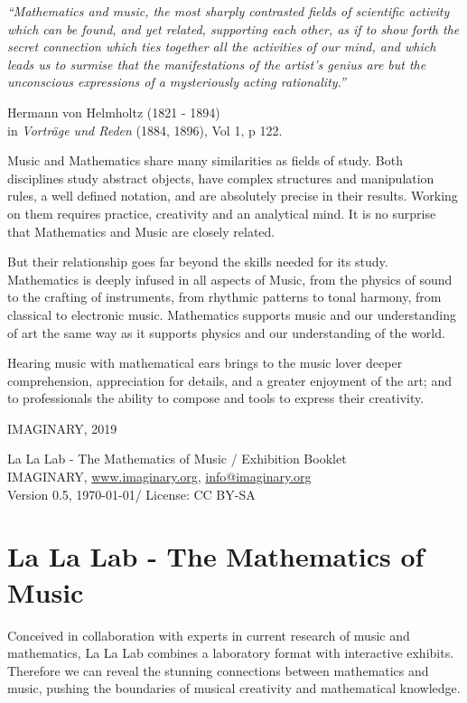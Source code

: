 \epigraph{ \itshape ``Mathematics and music, the most sharply contrasted fields of scientific activity which can be found, and yet related, supporting each other, as if to show forth the secret connection which ties together all the activities of our mind, and which leads us to surmise that the  manifestations of the artist's genius are but the unconscious expressions of a mysteriously acting rationality.''
}
{\vspace{0.5em}Hermann von Helmholtz (1821 - 1894) \\
in \textit{Vorträge und Reden} (1884, 1896), Vol 1, p 122.}


Music and Mathematics share many similarities as fields of study. Both disciplines study abstract objects, have complex structures and manipulation rules, a well defined notation, and are absolutely precise in their results. Working on them requires practice, creativity and an analytical mind. It is no surprise that Mathematics and Music are closely related.

But their relationship goes far beyond the skills needed for its study. Mathematics is deeply infused in all aspects of Music, from the physics of sound to the crafting of instruments, from rhythmic patterns to tonal harmony, from classical to electronic music. Mathematics supports music and our understanding of art the same way as it supports physics and our understanding of the world.

Hearing music with mathematical ears brings to the music lover deeper comprehension, appreciation for details, and a greater enjoyment of the art; and to professionals the ability to compose and tools to express their creativity.

\begin{flushright}
IMAGINARY, 2019
\end{flushright}

\vfill
La La Lab - The Mathematics of Music / Exhibition Booklet \\
IMAGINARY, \url{www.imaginary.org}, \href{mailto:info@imaginary.org}{info@imaginary.org} \\
Version 0.5, \today / License: CC BY-SA


\section*{La La Lab - The Mathematics of Music}

Conceived in collaboration with experts in current research of music and mathematics, La La Lab combines a laboratory format with interactive exhibits. Therefore we can reveal the stunning connections between mathematics and music, pushing the boundaries of musical creativity and mathematical knowledge.

